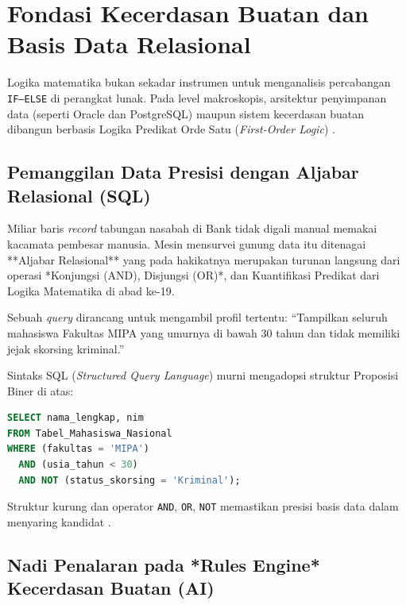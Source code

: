 \section{Fondasi Kecerdasan Buatan dan Basis Data Relasional}

Logika matematika bukan sekadar instrumen untuk menganalisis percabangan \texttt{IF--ELSE} di perangkat lunak. Pada level makroskopis, arsitektur penyimpanan data (seperti Oracle dan PostgreSQL) maupun sistem kecerdasan buatan dibangun berbasis Logika Predikat Orde Satu (\textit{First-Order Logic}) \cite{mit_6042,rosen2019}.

\subsection{Pemanggilan Data Presisi dengan Aljabar Relasional (SQL)}

Miliar baris \textit{record} tabungan nasabah di Bank tidak digali manual memakai kacamata pembesar manusia. Mesin mensurvei gunung data itu ditenagai **Aljabar Relasional** yang pada hakikatnya merupakan turunan langsung dari operasi *Konjungsi (AND), Disjungsi (OR)*, dan Kuantifikasi Predikat dari Logika Matematika di abad ke-19.

\begin{contoh}
Sebuah \textit{query} dirancang untuk mengambil profil tertentu: ``Tampilkan seluruh mahasiswa Fakultas MIPA yang umurnya di bawah 30 tahun dan tidak memiliki jejak skorsing kriminal.''

Sintaks SQL (\textit{Structured Query Language}) murni mengadopsi struktur Proposisi Biner di atas:
\begin{lstlisting}[language=SQL, basicstyle=\ttfamily\small, frame=single, caption={Analisis Klausa \texttt{WHERE} dengan Operator Logika Boolean}]
SELECT nama_lengkap, nim 
FROM Tabel_Mahasiswa_Nasional
WHERE (fakultas = 'MIPA') 
  AND (usia_tahun < 30) 
  AND NOT (status_skorsing = 'Kriminal');
\end{lstlisting}
Struktur kurung dan operator \texttt{AND}, \texttt{OR}, \texttt{NOT} memastikan presisi basis data dalam menyaring kandidat \cite{rosen2019}.
\end{contoh}

\subsection{Nadi Penalaran pada *Rules Engine* Kecerdasan Buatan (AI)}

